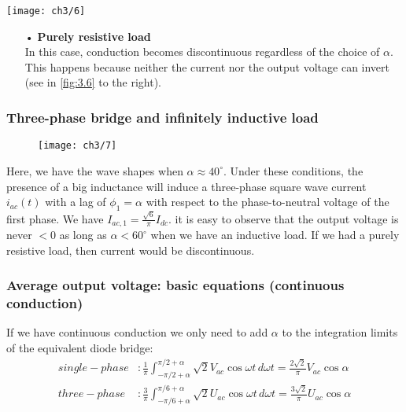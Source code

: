 					\begin{center}
					\texttt{[image: ch3/6]}
					\label{fig:3.6}
					\end{center}
					
					\begin{itemize}
					\item[•] \textbf{Purely resistive load}\\
					In this case, conduction becomes discontinuous regardless of the choice of $\alpha$. This happens because neither the current nor the output voltage can invert (see in \autoref{fig:3.6} to the right). 
					\end{itemize}
					
				\subsubsection{Three-phase bridge and infinitely inductive load}
					\begin{wrapfigure}[12]{l}{5.5cm}
					\vspace{-5mm}
					\texttt{[image: ch3/7]}
					\end{wrapfigure}
					Here, we have the wave shapes when $\alpha \approx 40^\circ$. Under these conditions, the presence of a big inductance will induce a three-phase square wave current $i_{ac}(t)$ with a lag of $\phi _1 = \alpha$ with respect to the phase-to-neutral voltage of the first phase. We have $I_{ac,1} = \frac{\sqrt{6}}{\pi}I_{dc}$. it is easy to observe that the output voltage is never $<0$ as long as $\alpha < 60^\circ$ when we have an inductive load. If we had a purely resistive load, then current would be discontinuous. 
					
				\subsubsection{Average output voltage: basic equations (continuous conduction)}
    				If we have continuous conduction we only need to add $\alpha$ to the integration limits of the equivalent diode bridge:				
					\begin{equation}
					\begin{aligned}
					single-phase &: \frac{1}{\pi} \int _{-\pi /2+\alpha}^{\pi /2 +\alpha} \sqrt{2}V_{ac}\cos\omega t\, d\omega t = \frac{2\sqrt{2}	}{\pi} V_{ac}\cos \alpha \\
					three-phase &: \frac{3}{\pi} \int _{-\pi /6+\alpha}^{\pi /6 +\alpha} \sqrt{2}U_{ac}\cos\omega t\, d\omega t = \frac{3\sqrt{2}	}{\pi} U_{ac}\cos \alpha
					\end{aligned}
					\end{equation}
		
